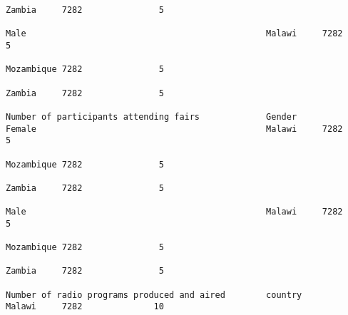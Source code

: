 \documentclass[11pt]{article}
\begin{document}
\begin{Verbatim}[commandchars=\\\{\}]
                                                                                                                                                                                                                 Zambia     7282               5  
                                                                                                                                                              Male                                               Malawi     7282               5  
                                                                                                                                                                                                                 Mozambique 7282               5  
                                                                                                                                                                                                                 Zambia     7282               5  
                                                                         Number of participants attending fairs             Gender                            Female                                             Malawi     7282               5  
                                                                                                                                                                                                                 Mozambique 7282               5  
                                                                                                                                                                                                                 Zambia     7282               5  
                                                                                                                                                              Male                                               Malawi     7282               5  
                                                                                                                                                                                                                 Mozambique 7282               5  
                                                                                                                                                                                                                 Zambia     7282               5  
                                                                         Number of radio programs produced and aired        country                                                                              Malawi     7282              10  

\end{Verbatim}
\end{document}

